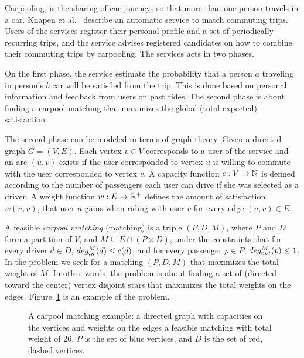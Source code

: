 Carpooling, is the sharing of car journeys so that more than one person travels
in a car.
Knapen et al.~\cite{knapen2013estimating} describe an automatic service
to match commuting trips.
Users of the services register their personal profile and a set of periodically
recurring trips, 
and the service advises registered candidates on how to combine their commuting
trips by carpooling.
The services acts in two phases. 

On the first phase, the service estimate the probability that a person $a$
traveling in person's $b$ car will be satisfied from the trip.
This is done based on personal information and feedback from users on past
rides.
The second phase is about finding a carpool matching
that maximizes the global (total expected) satisfaction.

The second phase can be modeled in terms of graph theory.
Given a directed graph $G = (V, E)$.
Each vertex $v \in V$ corresponds to a user of the service and an arc
$(u, v)$ exists if the user corresponded to vertex $u$ is willing to
commute with the user corresponded to vertex $v$.
A capacity function $ c: V \rightarrow \mathbb{N} $ is defined
according to the number of passengers each user can drive if she was
selected as a driver.
A weight function $w : E \rightarrow \mathbb{R^+} $ defines the amount of
satisfaction $w(u, v)$,
that user $u$ gains when riding with user $v$ for every edge $(u, v) \in E$.

A feasible \emph{carpool matching} (matching) is a triple 
$(P, D, M)$, where $P$ and $D$ form a partition of $V$, and 
$M \subseteq E \cap (P \times D)$,
under the constraints that for every driver $d \in D$, 
$deg^M_{in}(d) \leq c(d)$, 
and for every passenger $p \in P$, ${deg^M_{out}(p) \leq 1}$.
In the \textsc{\CARPOOL{}} problem we seek for a matching $(P, D, M)$ that maximizes the
total weight of $M$.
In other words, the \textsc{\CARPOOL{}} problem is about finding a set of 
(directed toward the center) vertex disjoint stars 
that maximizes the total weights on the edges.
Figure~\ref{fig:carpool} is an example of the \textsc{\CARPOOL{}} problem.
\begin{figure}
\centering

\caption[]{
\label{fig:carpool}
A carpool matching example: 
a directed graph with capacities on the vertices and weights on the edges 
a feasible matching with total weight of 26.
$P$ is the set of blue vertices, and $D$ is the set of red, dashed vertices. 
}
\end{figure}  

